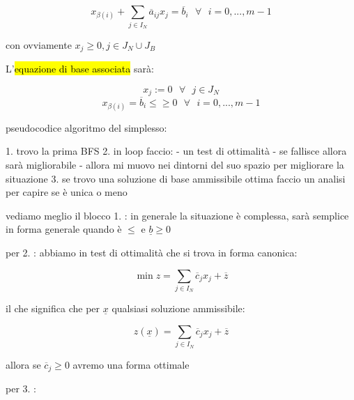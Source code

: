 $$x_{\beta(i)} + \sum_{j \in  I_N} \overline{a}_{ij}x_j = \overline{b}_i\ \ \ \forall\ \ \ i = 0, ..., m - 1$$

con ovviamente $x_j \geq 0, j \in J_N \cup J_B$

L'\hl{equazione di base associata} sarà:

$$x_j := 0\ \ \ \forall\ \ \ j \in J_N$$
$$x_{\beta(i)} = \overline{b}_i \leq \geq 0\ \ \ \forall\ \ \ i = 0, ..., m-1$$






pseudocodice algoritmo del simplesso:

1. trovo la prima BFS
2. in loop faccio:
	- un test di ottimalità
	- se fallisce allora sarà migliorabile
	- allora mi muovo nei dintorni del suo spazio per migliorare la situazione
3. se trovo una soluzione di base ammissibile ottima faccio un analisi per capire se è unica o meno


vediamo meglio il blocco 1. :
in generale la situazione è complessa, sarà semplice in forma generale quando è $\leq$ e $\underline{b} \geq 0$

per 2. :
abbiamo in test di ottimalità che si trova in forma canonica:

$$\min z = \sum_{j \in  I_N} \overline{c}_jx_j + \overline{z}$$

il che significa che per $\underline{x}$ qualsiasi soluzione ammissibile:

$$z(\underline{x}) = \sum_{j \in  I_N} \overline{c}_jx_j + \overline{z}$$

allora se $\overline{c}_j \geq 0$ avremo una forma ottimale 

per 3. :

